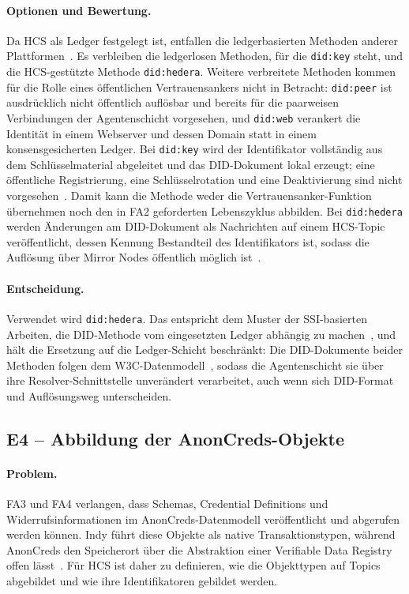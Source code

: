 \paragraph{Optionen und Bewertung.}
Da HCS als Ledger festgelegt ist, entfallen die ledgerbasierten Methoden anderer Plattformen~\cite{satybaldy2026}. Es verbleiben die ledgerlosen Methoden, für die \texttt{did:key} steht, und die HCS-gestützte Methode \texttt{did:hedera}. Weitere verbreitete Methoden kommen für die Rolle eines öffentlichen Vertrauensankers nicht in Betracht: \texttt{did:peer} ist ausdrücklich nicht öffentlich auflösbar und bereits für die paarweisen Verbindungen der Agentenschicht vorgesehen, und \texttt{did:web} verankert die Identität in einem Webserver und dessen Domain statt in einem konsensgesicherten Ledger. Bei \texttt{did:key} wird der Identifikator vollständig aus dem Schlüsselmaterial abgeleitet und das DID-Dokument lokal erzeugt; eine öffentliche Registrierung, eine Schlüsselrotation und eine Deaktivierung sind nicht vorgesehen~\cite{didkeyspec}. Damit kann die Methode weder die Vertrauensanker-Funktion übernehmen noch den in FA2 geforderten Lebenszyklus abbilden. Bei \texttt{did:hedera} werden Änderungen am DID-Dokument als Nachrichten auf einem HCS-Topic veröffentlicht, dessen Kennung Bestandteil des Identifikators ist, sodass die Auflösung über Mirror Nodes öffentlich möglich ist~\cite{hasheddidmethod}.

\paragraph{Entscheidung.}
Verwendet wird \texttt{did:hedera}. Das entspricht dem Muster der SSI-basierten Arbeiten, die DID-Methode vom eingesetzten Ledger abhängig zu machen~\cite{erler2023, manoj2022, torongo2023}, und hält die Ersetzung auf die Ledger-Schicht beschränkt: Die DID-Dokumente beider Methoden folgen dem W3C-Datenmodell~\cite{w3cdidcore}, sodass die Agentenschicht sie über ihre Resolver-Schnittstelle unverändert verarbeitet, auch wenn sich DID-Format und Auflösungsweg unterscheiden.

\subsection{E4 -- Abbildung der AnonCreds-Objekte}
\label{subsec:e4-anoncreds-abbildung}

\paragraph{Problem.}
FA3 und FA4 verlangen, dass Schemas, Credential Definitions und Widerrufsinformationen im AnonCreds-Datenmodell veröffentlicht und abgerufen werden können. Indy führt diese Objekte als native Transaktionstypen, während AnonCreds den Speicherort über die Abstraktion einer Verifiable Data Registry offen lässt~\cite{anoncredsspec}. Für HCS ist daher zu definieren, wie die Objekttypen auf Topics abgebildet und wie ihre Identifikatoren gebildet werden.

